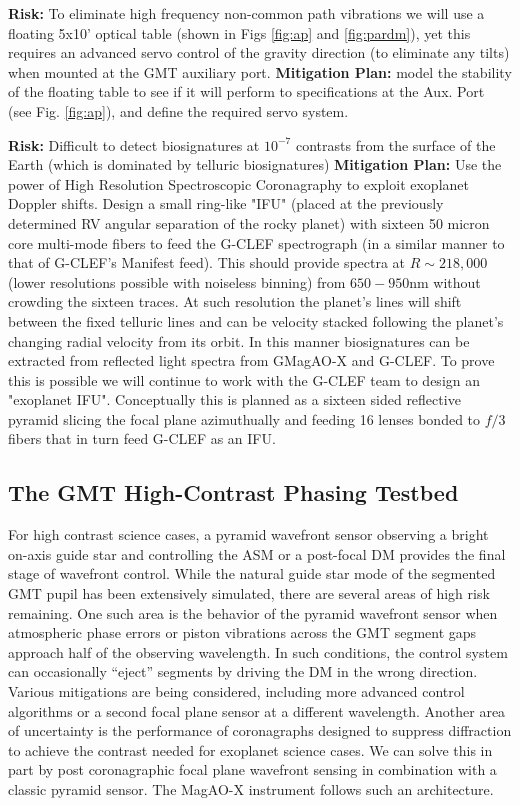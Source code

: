 \documentclass[12pt,preprint]{aastex}
\begin{document}
\textbf{Risk:} To eliminate high frequency non-common path vibrations we will use a floating 5x10' optical table (shown in Figs \ref{fig:ap} and \ref{fig:pardm}), yet this requires an advanced servo control of the gravity direction (to eliminate any tilts) when mounted at the GMT auxiliary port. \textbf{Mitigation Plan:} model the stability of the floating table to see if it will perform to specifications at the Aux. Port (see Fig. \ref{fig:ap}), and define the required servo system.

\textbf{Risk:} Difficult to detect biosignatures at $10^{-7}$ contrasts from the surface of the Earth (which is dominated by telluric biosignatures) \textbf{Mitigation Plan:} Use the power of High Resolution Spectroscopic Coronagraphy to exploit exoplanet Doppler shifts. Design a small ring-like "IFU" (placed at the previously determined RV angular separation of the rocky planet) with sixteen 50 micron core multi-mode fibers to feed the G-CLEF spectrograph (in a similar manner to that of G-CLEF’s Manifest feed). This should provide spectra at $R\sim218,000$ (lower resolutions possible with noiseless binning) from  $650-950$nm without crowding the sixteen traces. At such resolution the planet’s lines will shift between the fixed telluric lines and can be velocity stacked following the planet’s changing radial velocity from its orbit. In this manner biosignatures can be extracted from reflected light spectra from GMagAO-X and G-CLEF. To prove this is possible we will continue to work with the G-CLEF team to design an "exoplanet IFU". Conceptually this is planned as a sixteen sided reflective pyramid slicing the focal plane azimuthually and feeding 16 lenses bonded to $f/3$ fibers that in turn feed G-CLEF as an IFU. 

\subsection{The GMT High-Contrast Phasing Testbed}
\label{subsection:testbed}
For high contrast science cases, a pyramid wavefront sensor observing a bright on-axis guide star and controlling the ASM or a post-focal DM provides the final stage of wavefront control. While the natural guide star mode of the segmented GMT pupil has been extensively simulated, there are several areas of high risk remaining. One such area is the behavior of the pyramid wavefront sensor when atmospheric phase errors or piston vibrations across the GMT segment gaps approach half of the observing wavelength. In such conditions, the control system can occasionally “eject” segments by driving the DM in the wrong direction. Various mitigations are being considered, including more advanced control algorithms or a second focal plane sensor at a different wavelength. Another area of uncertainty is the performance of coronagraphs designed to suppress diffraction to achieve the contrast needed for exoplanet science cases. We can solve this in part by post coronagraphic focal plane wavefront sensing in combination with a classic pyramid sensor. The MagAO-X instrument follows such an architecture. 
\end{document}
